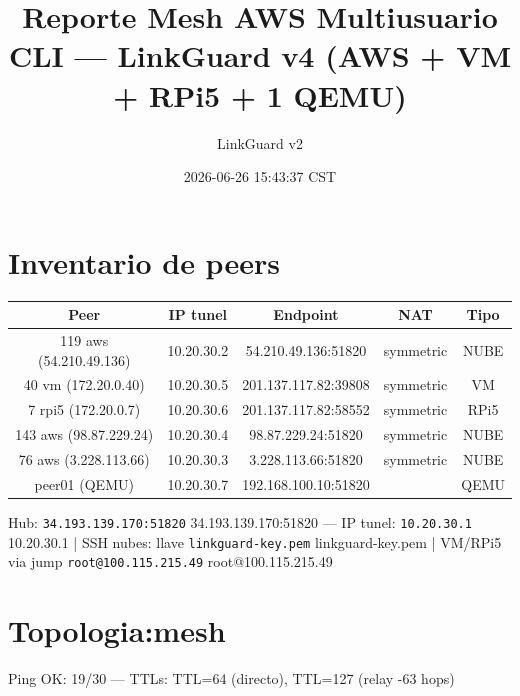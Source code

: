\documentclass[11pt,a4paper]{article}
\title{Reporte Mesh AWS Multiusuario CLI — LinkGuard v4 (AWS + VM + RPi5 + 1 QEMU)}
\author{LinkGuard v2}
\date{2026-06-26 15:43:37 CST}
\begin{document}
\maketitle

\section{Inventario de peers}
\begin{longtable}{|c|c|c|c|c|}
\hline
Peer & IP tunel & Endpoint & NAT & Tipo \\ \hline
119 aws (54.210.49.136) & 10.20.30.2 & 54.210.49.136:51820 & symmetric & NUBE \\ \hline
40 vm (172.20.0.40) & 10.20.30.5 & 201.137.117.82:39808 & symmetric & VM \\ \hline
7 rpi5 (172.20.0.7) & 10.20.30.6 & 201.137.117.82:58552 & symmetric & RPi5 \\ \hline
143 aws (98.87.229.24) & 10.20.30.4 & 98.87.229.24:51820 & symmetric & NUBE \\ \hline
76 aws (3.228.113.66) & 10.20.30.3 & 3.228.113.66:51820 & symmetric & NUBE \\ \hline
peer01 (QEMU) & 10.20.30.7 & 192.168.100.10:51820 &  & QEMU \\ \hline
\end{longtable}

Hub:  \texttt{34.193.139.170:51820} 34.193.139.170:51820  — IP tunel:  \texttt{10.20.30.1} 10.20.30.1  | SSH nubes: llave  \texttt{linkguard-key.pem} linkguard-key.pem  | VM/RPi5 via jump  \texttt{root@100.115.215.49} root@100.115.215.49\\

\section{Topologia:mesh}
Ping OK: 19/30 — TTLs: TTL=64 (directo), TTL=127 (relay -63 hops)\\
\end{document}
